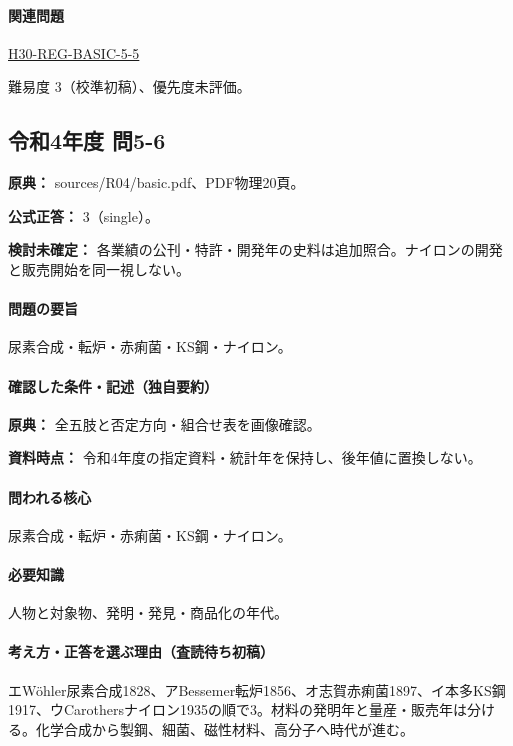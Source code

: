 \paragraph{関連問題} \hyperref[q:h30-reg-basic-5-5]{H30-REG-BASIC-5-5}

\par 難易度 3（校準初稿）、優先度未評価。

\subsection{令和4年度 問5-6}
\label{q:r04-reg-basic-5-6}

\noindent\textbf{原典：} sources/R04/basic.pdf、PDF物理20頁。

\textbf{公式正答：} 3（single）。

\par\textbf{検討未確定：} 各業績の公刊・特許・開発年の史料は追加照合。ナイロンの開発と販売開始を同一視しない。

\paragraph{問題の要旨} 尿素合成・転炉・赤痢菌・KS鋼・ナイロン。

\paragraph{確認した条件・記述（独自要約）}\mbox{}\par

\noindent\textbf{原典：} 全五肢と否定方向・組合せ表を画像確認。\par

\noindent\textbf{資料時点：} 令和4年度の指定資料・統計年を保持し、後年値に置換しない。\par

\paragraph{問われる核心} 尿素合成・転炉・赤痢菌・KS鋼・ナイロン。

\paragraph{必要知識} 人物と対象物、発明・発見・商品化の年代。

\paragraph{考え方・正答を選ぶ理由（査読待ち初稿）} エWöhler尿素合成1828、アBessemer転炉1856、オ志賀赤痢菌1897、イ本多KS鋼1917、ウCarothersナイロン1935の順で3。材料の発明年と量産・販売年は分ける。化学合成から製鋼、細菌、磁性材料、高分子へ時代が進む。

